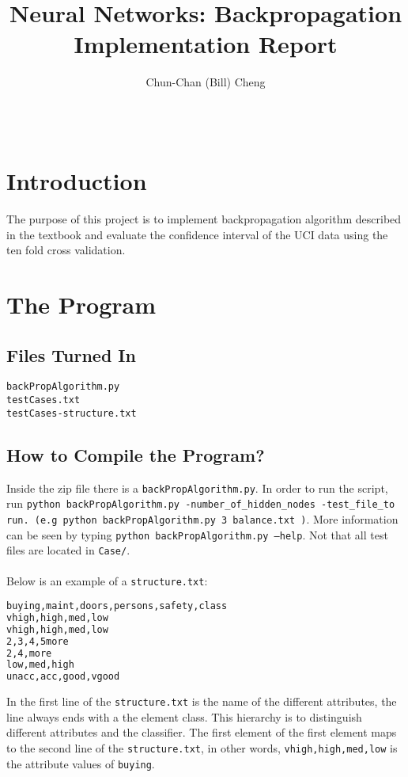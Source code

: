 \documentclass{sig-alternate-05-2015}
\begin{document}
\title{Neural Networks: Backpropagation Implementation Report}
\author{
Chun-Chan (Bill) Cheng\\
        \\
       \\
 }

\maketitle
\section{Introduction}
The purpose of this project is to implement backpropagation algorithm described in the textbook and evaluate the confidence interval of the UCI data using the ten fold cross validation. 

\section{The Program}
\subsection{Files Turned In}

\texttt{backPropAlgorithm.py\\
\indent testCases.txt\\
\indent testCases-structure.txt\\
}

\subsection{How to Compile the Program?}
Inside the zip file there is a \texttt{backPropAlgorithm.py}. In order to run the script, run \texttt{python backPropAlgorithm.py -number\_of\_hidden\_nodes -test\_file\_to run. (e.g python backPropAlgorithm.py 3 balance.txt )}. More information can be seen by typing \texttt{python backPropAlgorithm.py --help}. Not that all test files are located in \texttt{Case/}.\\\\
Below is an example of a \texttt{structure.txt}:
\begin{lstlisting}[language=bash]
buying,maint,doors,persons,safety,class
vhigh,high,med,low
vhigh,high,med,low
2,3,4,5more
2,4,more
low,med,high
unacc,acc,good,vgood
\end{lstlisting}
In the first line of the \texttt{structure.txt} is the name of the different attributes, the line always ends with a the element class. This hierarchy is to distinguish different attributes and the classifier. The first element of the first element maps to the second line of the \texttt{structure.txt}, in other words, \texttt{vhigh,high,med,low} is the attribute values of \texttt{buying}.
\end{document}
